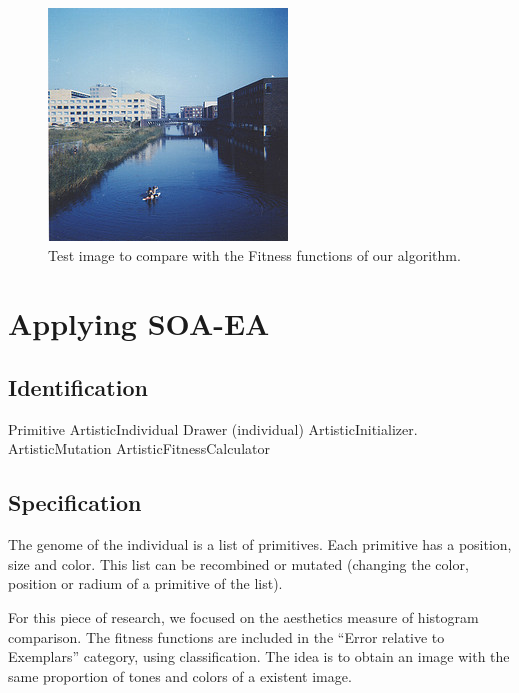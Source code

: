 \begin{figure}
\centering
   \includegraphics[scale =3] {gfx/art/flevopark.jpg}
\caption{Test image to compare with the Fitness functions of our algorithm.}
\label{fig:flevopark}
\end{figure}


\section{Applying SOA-EA}
\label{sec:art:soaea}

\subsection{Identification}

Primitive
ArtisticIndividual
Drawer (individual)
ArtisticInitializer.
ArtisticMutation
ArtisticFitnessCalculator


\subsection{Specification}

The genome of the individual is a list of
primitives. %
Each primitive has a position, size and color. This list can
be recombined or mutated (changing the color, position or radium of a
primitive of the list). 




For this piece of research, we focused on the aesthetics measure of
histogram comparison. The fitness functions are included in the
``Error relative to Exemplars'' category, using 
\cite{galanter2012computational} classification. The idea is to obtain
an image with the same proportion of tones and colors of a 
existent image. 

